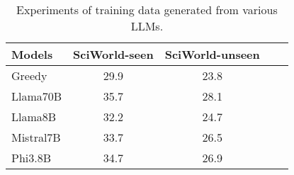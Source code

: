 \begin{table*}[!h]
    \centering
    \begin{tabular}{lcccc}
    \toprule
    Models    & SciWorld-seen & SciWorld-unseen \\
    \midrule
    Greedy  & 29.9      & 23.8 &  \\
    Llama70B  & 35.7      & 28.1 &  \\
    Llama8B & 32.2 & 24.7  \\
    Mistral7B & 33.7 &  26.5 \\
    Phi3.8B &34.7	&26.9 \\
    \bottomrule
    \end{tabular}
    \caption{Experiments of training data generated from various LLMs.}
    \label{tab:dataquality}
\end{table*}

